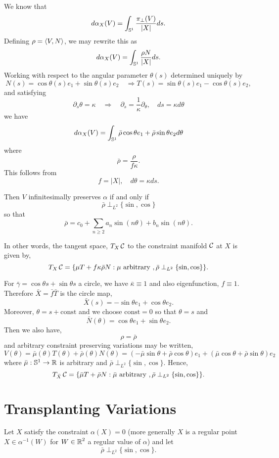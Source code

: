 \documentclass[12pt]{article}
\begin{document}
We know that
\[
d\alpha_X (V) = \int_{\operatorname{\mathbb{S}^1}} \frac{\pi_{\perp} (V)}{|X|} ds.
\]
Defining \(\rho = \left\langle{V},{N}\right\rangle\), we may rewrite this as
\[
d\alpha_X (V) = \int_{\operatorname{\mathbb{S}^1}} \frac{\rho N}{|X|} ds.
\]
Working with respect to the angular parameter \(\theta(s)\) determined uniquely by
\[
N(s) = \cos \theta(s) e_1 + \sin \theta(s) e_2 \quad \Rightarrow T(s) = \sin \theta(s) e_1 - \cos \theta(s) e_2,
\]
and satisfying
\[
\partial_s \theta = \kappa \quad \Rightarrow \quad \partial_s = \frac{1}{\kappa} \partial_{\theta}, \quad ds = \kappa d\theta
\]
we have
\[
d\alpha_X (V) = \int_{\operatorname{\mathbb{S}^1}} \bar{\rho} \cos\theta e_1 + \bar{\rho} \sin\theta e_2 d\theta
\]
where
\[
\bar{\rho} = \frac{\rho}{f \kappa}.
\]
This follows from
\[
f = |X|, \quad d\theta = \kappa ds.
\]

Then \(V\) infinitesimally preserves \(\alpha\) if and only if
\[
\bar{\rho} \perp_{L^2} \{\sin, \cos\}
\]
so that
\[
\bar{\rho} = c_0 + \sum_{n\geq 2} a_n \sin(n \theta) + b_n \sin(n \theta).
\]

In other words, the tangent space, \(T_X \operatorname{\mathcal{C}}\) to the constraint manifold \(\operatorname{\mathcal{C}}\) at \(X\) is given by,
\[
T_X \operatorname{\mathcal{C}} = \{\mu T + f\kappa\bar{\rho} N : \mu \text{ arbitrary }, \bar{\rho} \perp_{L^2} \{\sin, \cos\}\}.
\]

For \(\bar{\gamma} = \cos\theta s + \sin \theta s\) a circle, we have \(\bar{\kappa} \equiv 1\) and also eigenfunction, \(f \equiv 1\). Therefore \(\bar{X} = \bar{f} \bar{T}\) is the circle map,
\[
\bar{X}(s) = -\sin\theta e_1 + \cos\theta e_2.
\]
Moreover, \(\theta = s + \text{const}\) and we choose \(\text{const} = 0\) so that \(\theta = s\) and
\[
\bar{N}(\theta) = \cos\theta e_1 + \sin\theta e_2.
\]
Then we also have,
\[
\rho = \bar{\rho}
\]
and arbitrary constraint preserving variations may be written,
\[
V(\theta) = \bar{\mu}(\theta) T(\theta) + \bar{\rho}(\theta) N(\theta) = (- \bar{\mu}\sin\theta + \bar{\rho} \cos\theta) e_1 + (\bar{\mu}\cos\theta + \bar{\rho}\sin\theta) e_2
\]
where \(\bar{\mu} : \operatorname{\mathbb{S}^1} \to \operatorname{\mathbb{R}}\) is arbitrary and \(\bar{\rho} \perp_{L^2} \{\sin, \cos\}\). Hence,
\[
T_{\bar{X}} \operatorname{\mathcal{C}} = \{\bar{\mu} T + \bar{\rho} N : \bar{\mu} \text{ arbitrary }, \bar{\rho} \perp_{L^2} \{\sin, \cos\}\}.
\]

\section{Transplanting Variations}

Let \(X\) satisfy the constraint \(\alpha(X) = 0\) (more generally \(X\) is a regular point \(X \in \alpha^{-1} (W)\) for \(W \in \operatorname{\mathbb{R}}^2\) a regular value of \(\alpha\)) and let
\[
\bar{\rho} \perp_{L^2} \{\sin, \cos\}.
\]
\end{document}
